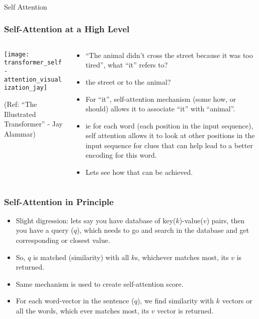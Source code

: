 \begin{frame}[fragile]\frametitle{}
\begin{center}
{\Large Self Attention}
\end{center}
\end{frame}

\begin{frame}[fragile]\frametitle{Self-Attention at a High Level}

\begin{columns}
    \begin{column}[T]{0.5\linewidth}
\begin{center}
\texttt{[image: transformer\_self-attention\_visualization\_jay]}


{\tiny (Ref: ``The Illustrated Transformer'' - Jay Alammar)}
\end{center}		

		\end{column}
    \begin{column}[T]{0.5\linewidth}

\begin{itemize}
\item ``The animal didn't cross the street because it was too tired'', what ``it'' refers to?
\item  the street or to the animal?
\item For “it”, self-attention mechanism (some how, or should) allows it to associate “it” with “animal”.
\item ie for each word (each position in the input sequence), self attention allows it to look at other positions in the input sequence for clues that can help lead to a better encoding for this word.
\item Lets see how that can be achieved.
\end{itemize}
    \end{column}
  \end{columns}
\end{frame}

\begin{frame}[fragile]\frametitle{Self-Attention in Principle}


\begin{itemize}
\item Slight digression: lets say you have database of key($k$)-value($v$) pairs, then you have a query ($q$), which needs to go and search in the database and get corresponding or closest value.
\item So, $q$ is matched (similarity) with all $k$s, whichever matches most, its $v$ is returned.
\item Same mechanism is used to create self-attention score.
\item For each word-vector in the sentence ($q$), we find similarity with $k$ vectors or all the words, which ever matches most, its $v$ vector is returned.
\end{itemize}

\end{frame}

